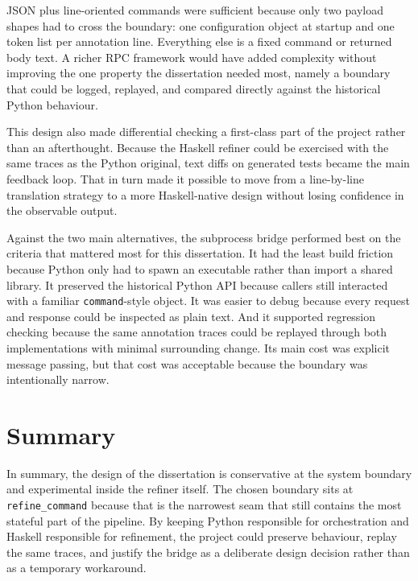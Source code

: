 JSON plus line-oriented commands were sufficient because only two
payload shapes had to cross the boundary: one configuration object at
startup and one token list per annotation line. Everything else is a
fixed command or returned body text. A richer RPC framework would have
added complexity without improving the one property the dissertation
needed most, namely a boundary that could be logged, replayed, and
compared directly against the historical Python behaviour.


This design also made differential checking a first-class part of the
project rather than an afterthought. Because the Haskell refiner could
be exercised with the same traces as the Python original, text diffs
on generated tests became the main feedback loop. That in turn made it
possible to move from a line-by-line translation strategy to a more
Haskell-native design without losing confidence in the observable
output.

Against the two main alternatives, the subprocess bridge performed
best on the criteria that mattered most for this dissertation. It had
the least build friction because Python only had to spawn an
executable rather than import a shared library. It preserved the
historical Python API because callers still interacted with a familiar
\texttt{command}-style object. It was easier to debug because every
request and response could be inspected as plain text. And it supported
regression checking because the same annotation traces could be replayed
through both implementations with minimal surrounding change. Its main
cost was explicit message passing, but that cost was acceptable because
the boundary was intentionally narrow.


\section{Summary}
\label{sec:SummaryDesign}

In summary, the design of the dissertation is conservative at the
system boundary and experimental inside the refiner itself. The chosen
boundary sits at \texttt{refine\_command} because that is the
narrowest seam that still contains the most stateful part of the
pipeline. By keeping Python responsible for orchestration and Haskell
responsible for refinement, the project could preserve behaviour,
replay the same traces, and justify the bridge as a deliberate design
decision rather than as a temporary workaround.
